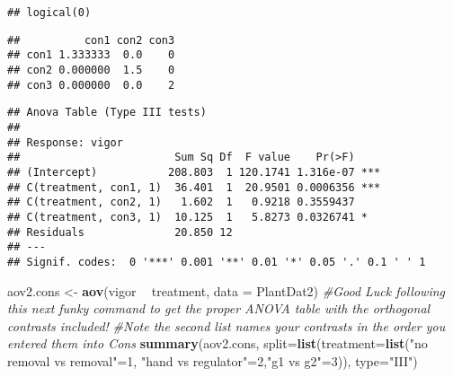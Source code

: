 \documentclass[]{article}
\newenvironment{Shaded}{\begin{snugshade}}{\end{snugshade}}
\newcommand{\KeywordTok}[1]{\textcolor[rgb]{0.13,0.29,0.53}{\textbf{#1}}}
\newcommand{\DataTypeTok}[1]{\textcolor[rgb]{0.13,0.29,0.53}{#1}}
\newcommand{\DecValTok}[1]{\textcolor[rgb]{0.00,0.00,0.81}{#1}}
\newcommand{\StringTok}[1]{\textcolor[rgb]{0.31,0.60,0.02}{#1}}
\newcommand{\CommentTok}[1]{\textcolor[rgb]{0.56,0.35,0.01}{\textit{#1}}}
\newcommand{\OperatorTok}[1]{\textcolor[rgb]{0.81,0.36,0.00}{\textbf{#1}}}
\newcommand{\NormalTok}[1]{#1}
\begin{document}
\begin{verbatim}
## logical(0)
\end{verbatim}

\begin{Shaded}
\end{Shaded}

\begin{verbatim}
##          con1 con2 con3
## con1 1.333333  0.0    0
## con2 0.000000  1.5    0
## con3 0.000000  0.0    2
\end{verbatim}

\begin{Shaded}
\end{Shaded}

\begin{verbatim}
## Anova Table (Type III tests)
## 
## Response: vigor
##                        Sum Sq Df  F value    Pr(>F)    
## (Intercept)           208.803  1 120.1741 1.316e-07 ***
## C(treatment, con1, 1)  36.401  1  20.9501 0.0006356 ***
## C(treatment, con2, 1)   1.602  1   0.9218 0.3559437    
## C(treatment, con3, 1)  10.125  1   5.8273 0.0326741 *  
## Residuals              20.850 12                       
## ---
## Signif. codes:  0 '***' 0.001 '**' 0.01 '*' 0.05 '.' 0.1 ' ' 1
\end{verbatim}

\begin{Shaded}
\begin{Highlighting}[]
\NormalTok{aov2.cons <-}\StringTok{ }\KeywordTok{aov}\NormalTok{(vigor }\OperatorTok{~}\StringTok{ }\NormalTok{treatment, }\DataTypeTok{data =}\NormalTok{ PlantDat2)}
\CommentTok{#Good Luck following this next funky command to get the proper ANOVA table with the orthogonal contrasts included!}
\CommentTok{#Note the second list names your contrasts in the order you entered them into Cons}
\KeywordTok{summary}\NormalTok{(aov2.cons, }\DataTypeTok{split=}\KeywordTok{list}\NormalTok{(}\DataTypeTok{treatment=}\KeywordTok{list}\NormalTok{(}\StringTok{"no removal vs removal"}\NormalTok{=}\DecValTok{1}\NormalTok{, }\StringTok{"hand vs regulator"}\NormalTok{=}\DecValTok{2}\NormalTok{,}\StringTok{"g1 vs g2"}\NormalTok{=}\DecValTok{3}\NormalTok{)), }\DataTypeTok{type=}\StringTok{"III"}\NormalTok{)}
\end{Highlighting}
\end{Shaded}
\end{document}
